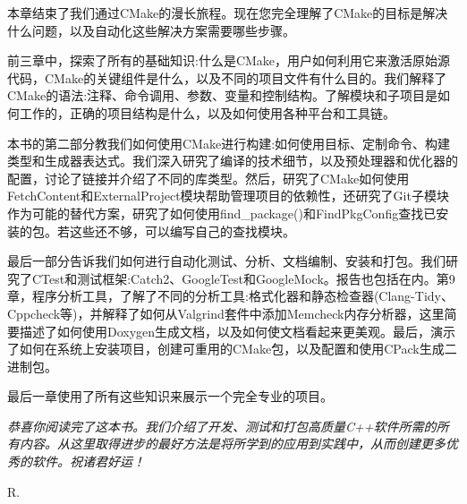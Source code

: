 本章结束了我们通过CMake的漫长旅程。现在您完全理解了CMake的目标是解决什么问题，以及自动化这些解决方案需要哪些步骤。

前三章中，探索了所有的基础知识:什么是CMake，用户如何利用它来激活原始源代码，CMake的关键组件是什么，以及不同的项目文件有什么目的。我们解释了CMake的语法:注释、命令调用、参数、变量和控制结构。了解模块和子项目是如何工作的，正确的项目结构是什么，以及如何使用各种平台和工具链。

本书的第二部分教我们如何使用CMake进行构建:如何使用目标、定制命令、构建类型和生成器表达式。我们深入研究了编译的技术细节，以及预处理器和优化器的配置，讨论了链接并介绍了不同的库类型。然后，研究了CMake如何使用FetchContent和ExternalProject模块帮助管理项目的依赖性，还研究了Git子模块作为可能的替代方案，研究了如何使用find\_package()和FindPkgConfig查找已安装的包。若这些还不够，可以编写自己的查找模块。

最后一部分告诉我们如何进行自动化测试、分析、文档编制、安装和打包。我们研究了CTest和测试框架:Catch2、GoogleTest和GoogleMock。报告也包括在内。第9章，程序分析工具，了解了不同的分析工具:格式化器和静态检查器(Clang-Tidy、Cppcheck等)，并解释了如何从Valgrind套件中添加Memcheck内存分析器，这里简要描述了如何使用Doxygen生成文档，以及如何使文档看起来更美观。最后，演示了如何在系统上安装项目，创建可重用的CMake包，以及配置和使用CPack生成二进制包。

最后一章使用了所有这些知识来展示一个完全专业的项目。

\textit{恭喜你阅读完了这本书。我们介绍了开发、测试和打包高质量C++软件所需的所有内容。从这里取得进步的最好方法是将所学到的应用到实践中，从而创建更多优秀的软件。祝诸君好运！}

R.















